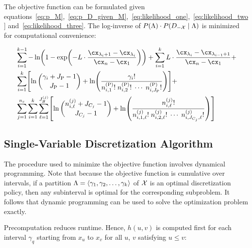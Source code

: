 The objective function can be formulated given equations~\ref{eq:p_M},~\ref{eq:p_D_given_M},~\ref{eq:likelihood_one},~\ref{eq:likelihood_two} and~\ref{eq:likelihood_three}.
The log-inverse of $P(\Lambda) \cdot P(D_{-\mathcal{X}} \mid \Lambda)$ is minimized for computational convenience:

\begin{equation}
\label{eq:opt_prob}
\begin{aligned}
  & \sum_{i=1}^{k-1}
   - \ln
    \paren{
      1 - \exp
      \paren{
        - L \cdot  \frac{
                         \cx_{\lambda_i +1} - \cx_{\lambda_i}
                       }{
                         \cx_n - \cx_1
                        }
      }
    }
      + \sum_{i=1}^{k}
      L \cdot \frac{\cx_{\lambda_{i}} - \cx_{\lambda_{i-1} + 1}}{\cx_n - \cx_1} + \\
  & \sum_{i=1}^{k} \brock{
  \ln{{\gamma_i + J_\text{P} - 1}\choose{J_\text{P} - 1}}
  +{ \ln \paren{
        \frac{
          {\gamma_i}!
        }{
          {n^{(\text{P})}_{i,1}}! \; {n^{(\text{P})}_{i,2}}! \; \cdots \; {n^{(\text{P})}_{i,J_\text{P}}}!
        }
      }}
  } + \\
  & \sum_{j=1}^{n_c} \sum_{i=1}^k \sum_{\ell=1}^{J^{(j)}_{\bm{S}}} \brock{
  { \ln
          {{n^{(j)}_{i,\ell} + J_{C_j} - 1}\choose{J_{C_j}-1}}}
    +
    \ln \paren{ {
          \frac{
            {n^{(j)}_{i,\ell}}!
          }{
            {n^{(j)}_{i,1,\ell}!} \; {n^{(j)}_{i,2,\ell}!} \; \cdots \; {n^{(j)}_{i,J_{C_j},\ell}!}
          }
        }
        } }
\end{aligned}
\end{equation}



\subsection{Single-Variable Discretization Algorithm}
\label{subsec:algo}

The procedure used to minimize the objective function involves dynamical programming.
Note that because the objective function is cumulative over intervals, if a partition $\Lambda = \langle \gamma_1, \gamma_2, \ldots, \gamma_k \rangle$ of $\mathcal{X}$ is an optimal discretization policy, then any subinterval is optimal for the corresponding subproblem.
It follows that dynamic programming can be used to solve the optimization problem exactly.

Precomputation reduces runtime.
Hence, $h(u,v)$ is computed first for each interval $\gamma_q$ starting from $x_{u}$ to $x_{v}$ for all $u$, $v$ satisfying $u \leq v$:

